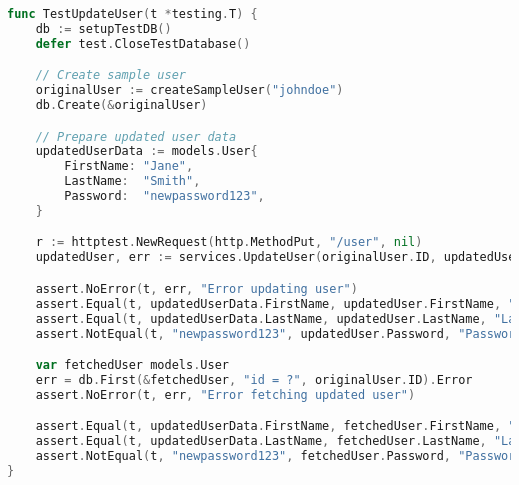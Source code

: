 \begin{lstlisting}[language=Go, caption=Test Update User Function, frame=single]
func TestUpdateUser(t *testing.T) {
    db := setupTestDB()
    defer test.CloseTestDatabase()

    // Create sample user
    originalUser := createSampleUser("johndoe")
    db.Create(&originalUser)

    // Prepare updated user data
    updatedUserData := models.User{
        FirstName: "Jane",
        LastName:  "Smith",
        Password:  "newpassword123",
    }

    r := httptest.NewRequest(http.MethodPut, "/user", nil)
    updatedUser, err := services.UpdateUser(originalUser.ID, updatedUserData, r)

    assert.NoError(t, err, "Error updating user")
    assert.Equal(t, updatedUserData.FirstName, updatedUser.FirstName, "First name mismatch")
    assert.Equal(t, updatedUserData.LastName, updatedUser.LastName, "Last name mismatch")
    assert.NotEqual(t, "newpassword123", updatedUser.Password, "Password should be hashed")

    var fetchedUser models.User
    err = db.First(&fetchedUser, "id = ?", originalUser.ID).Error
    assert.NoError(t, err, "Error fetching updated user")

    assert.Equal(t, updatedUserData.FirstName, fetchedUser.FirstName, "First name mismatch in database")
    assert.Equal(t, updatedUserData.LastName, fetchedUser.LastName, "Last name mismatch in database")
    assert.NotEqual(t, "newpassword123", fetchedUser.Password, "Password should be hashed in database")
}
\end{lstlisting}
\pagebreak

